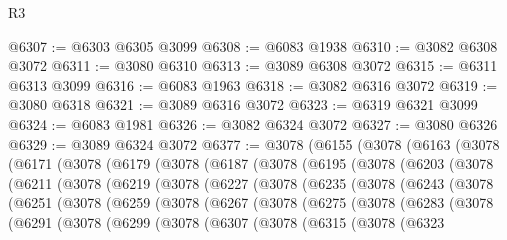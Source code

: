 \begin{lexlean}{R3}
\begin{coremodule}
@6307 := @6303 @6305 @3099
@6308 := @6083 @1938
@6310 := @3082 @6308 @3072
@6311 := @3080 @6310
@6313 := @3089 @6308 @3072
@6315 := @6311 @6313 @3099
@6316 := @6083 @1963
@6318 := @3082 @6316 @3072
@6319 := @3080 @6318
@6321 := @3089 @6316 @3072
@6323 := @6319 @6321 @3099
@6324 := @6083 @1981
@6326 := @3082 @6324 @3072
@6327 := @3080 @6326
@6329 := @3089 @6324 @3072
@6377 := @3078
    (@6155
      (@3078
        (@6163
          (@3078
            (@6171
              (@3078
                (@6179
                  (@3078
                    (@6187
                      (@3078
                        (@6195
                          (@3078
                            (@6203
                              (@3078
                                (@6211
                                  (@3078
                                    (@6219
                                      (@3078
                                        (@6227
                                          (@3078
                                            (@6235
                                              (@3078
                                                (@6243
                                                  (@3078
                                                    (@6251
                                                      (@3078
                                                        (@6259
                                                          (@3078
                                                            (@6267
                                                              (@3078
                                                                (@6275
                                                                  (@3078
                                                                    (@6283
                                                                      (@3078
                                                                        (@6291
                                                                          (@3078
                                                                            (@6299
                                                                              (@3078
                                                                                (@6307
                                                                                  (@3078
                                                                                    (@6315
                                                                                      (@3078
                                                                                        (@6323

\end{coremodule}
\end{lexlean}
